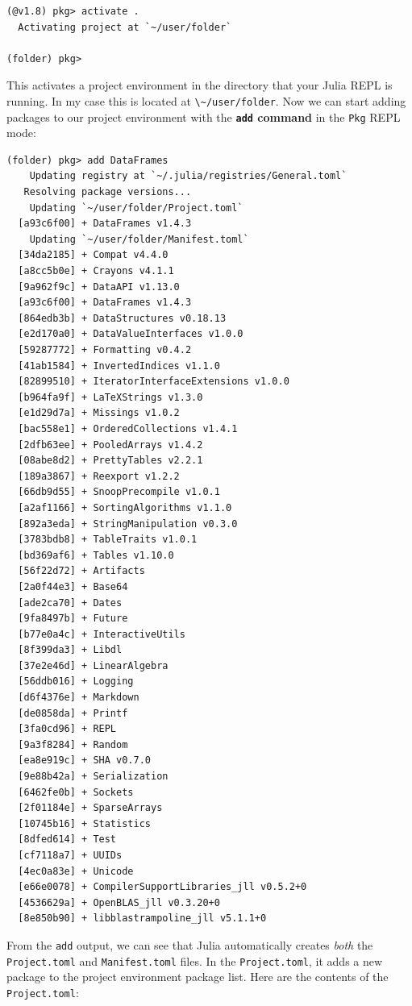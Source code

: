 \documentclass[
  notoc %
]{tufte-book}
\newcommand{\passthrough}[1]{#1}
\begin{document}
\begin{lstlisting}
(@v1.8) pkg> activate .
  Activating project at `~/user/folder`

(folder) pkg>
\end{lstlisting}

This activates a project environment in the directory that your Julia
REPL is running. In my case this is located at
\passthrough{\lstinline!\~/user/folder!}. Now we can start adding
packages to our project environment with the
\textbf{\passthrough{\lstinline!add!} command} in the
\passthrough{\lstinline!Pkg!} REPL mode:

\begin{lstlisting}
(folder) pkg> add DataFrames
    Updating registry at `~/.julia/registries/General.toml`
   Resolving package versions...
    Updating `~/user/folder/Project.toml`
  [a93c6f00] + DataFrames v1.4.3
    Updating `~/user/folder/Manifest.toml`
  [34da2185] + Compat v4.4.0
  [a8cc5b0e] + Crayons v4.1.1
  [9a962f9c] + DataAPI v1.13.0
  [a93c6f00] + DataFrames v1.4.3
  [864edb3b] + DataStructures v0.18.13
  [e2d170a0] + DataValueInterfaces v1.0.0
  [59287772] + Formatting v0.4.2
  [41ab1584] + InvertedIndices v1.1.0
  [82899510] + IteratorInterfaceExtensions v1.0.0
  [b964fa9f] + LaTeXStrings v1.3.0
  [e1d29d7a] + Missings v1.0.2
  [bac558e1] + OrderedCollections v1.4.1
  [2dfb63ee] + PooledArrays v1.4.2
  [08abe8d2] + PrettyTables v2.2.1
  [189a3867] + Reexport v1.2.2
  [66db9d55] + SnoopPrecompile v1.0.1
  [a2af1166] + SortingAlgorithms v1.1.0
  [892a3eda] + StringManipulation v0.3.0
  [3783bdb8] + TableTraits v1.0.1
  [bd369af6] + Tables v1.10.0
  [56f22d72] + Artifacts
  [2a0f44e3] + Base64
  [ade2ca70] + Dates
  [9fa8497b] + Future
  [b77e0a4c] + InteractiveUtils
  [8f399da3] + Libdl
  [37e2e46d] + LinearAlgebra
  [56ddb016] + Logging
  [d6f4376e] + Markdown
  [de0858da] + Printf
  [3fa0cd96] + REPL
  [9a3f8284] + Random
  [ea8e919c] + SHA v0.7.0
  [9e88b42a] + Serialization
  [6462fe0b] + Sockets
  [2f01184e] + SparseArrays
  [10745b16] + Statistics
  [8dfed614] + Test
  [cf7118a7] + UUIDs
  [4ec0a83e] + Unicode
  [e66e0078] + CompilerSupportLibraries_jll v0.5.2+0
  [4536629a] + OpenBLAS_jll v0.3.20+0
  [8e850b90] + libblastrampoline_jll v5.1.1+0
\end{lstlisting}

From the \passthrough{\lstinline!add!} output, we can see that Julia
automatically creates \emph{both} the
\passthrough{\lstinline!Project.toml!} and
\passthrough{\lstinline!Manifest.toml!} files. In the
\passthrough{\lstinline!Project.toml!}, it adds a new package to the
project environment package list. Here are the contents of the
\passthrough{\lstinline!Project.toml!}:
\end{document}
